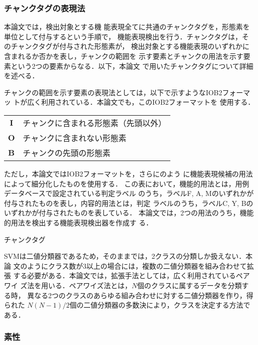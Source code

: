\documentclass[japanese]{jnlp_1.3e}
\begin{document}
\subsubsection{チャンクタグの表現法}

本論文では，検出対象とする機
能表現全てに共通のチャンクタグを，形態素を単位として付与するという手順で，
機能表現検出を行う．チャンクタグは，そのチャンクタグが付与された形態素が，
検出対象とする機能表現のいずれかに含まれるか否かを表し，チャンクの範囲を
示す要素とチャンクの用法を示す要素という2つの要素からなる．以下，本論文
で用いたチャンクタグについて詳細を述べる．

チャンクの範囲を示す要素の表現法としては，以下で示すようなIOB2フォーマッ
ト\cite{Sang00a}が広く利用されている．本論文でも，このIOB2フォーマットを
使用する．
\begin{center}
  \begin{tabular}{cl}
    \textbf{I} & チャンクに含まれる形態素（先頭以外） \\
    \textbf{O} & チャンクに含まれない形態素 \\
    \textbf{B} & チャンクの先頭の形態素 \\
  \end{tabular}
\end{center}

ただし，本論文ではIOB2フォーマットを，さらにのよう
に機能表現候補の用法によって細分化したものを使用する．
この表において，機能的用法とは，用例データベースで設定されている判定ラベル
のうち，ラベルF, A, Mのいずれかが付与されたものを表し，内容的用法とは，判定
ラベルのうち，ラベルC, Y, Bのいずれかが付与されたものを表している．
本論文では，2つの用法のうち，機能的用法を検出する機能表現検出器を作成す
る．

\begin{table}[t]
 \caption{チャンクタグ}
 \label{tbl:chunktag}

\end{table}


SVMは二値分類器であるため，そのままでは，2クラスの分類しか扱えない．本論
文のようにクラス数が3以上の場合には，複数の二値分類器を組み合わせて拡張
する必要がある．本論文では，拡張手法としては，広く利用されているペアワイ
ズ法を用いる．ペアワイズ法とは，$N$個のクラスに属するデータを分類する時，
異なる2つのクラスのあらゆる組み合わせに対する二値分類器を作り，得られた
$N(N-1)/2$個の二値分類器の多数決により，クラスを決定する方法である．

\subsubsection{素性}
\label{subsec:feature}
\end{document}
